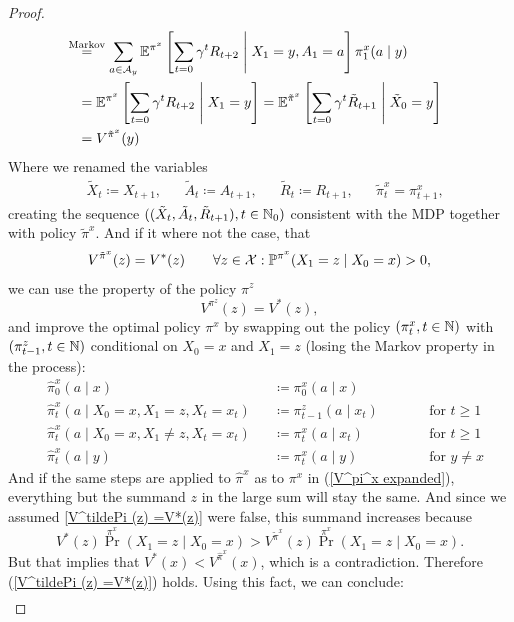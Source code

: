 \begin{proof}
\begin{align}
		&\lxeq{\text{Markov}} \sum_{a\in\cA_y}
		\E^{\pi^x}\left[\sum_{t=0}\gamma^t R_{t+2}\;\middle|\; X_1=y, A_1=a\right]\pi^x_1(a\mid y)\nonumber\\
		&=\E^{\pi^x}\left[\sum_{t=0}\gamma^t R_{t+2}\;\middle|\; X_1=y\right]
		=\E^{\tilde{\pi}^x}\left[\sum_{t=0}\gamma^t \tilde{R}_{t+1}\;\middle|\; \tilde{X}_0=y\right]\nonumber\\
		&=V^{\tilde{\pi}^x}(y)
	\end{align}
	Where we renamed the variables
	\begin{align*}
		&\tilde{X}_t\coloneqq X_{t+1}, &&\tilde{A}_t\coloneqq A_{t+1}, 
		&&\tilde{R}_t\coloneqq R_{t+1}, &&\tilde{\pi}^x_t=\pi^x_{t+1}, 
	\end{align*}
	creating the sequence 
	\(((\tilde{X}_t,\tilde{A}_t, \tilde{R}_{t+1}), t\in\mathbb{N}_0)\) consistent with the MDP together with policy \(\tilde{\pi}^x\). And if it where not the case, that 
	\begin{align}
		V^{\tilde{\pi}^x}(z)=V^*(z) \qquad \forall z\in\mathcal{X}:\mathbb{P}^{\pi^x}(X_1=z\mid X_0=x)>0,
		\label{V^tildePi (z) =V*(z)}
	\end{align}
	we can use the property of the policy \(\pi^z\)
	\[
		V^{\pi^z}(z)=V^*(z),
	\] and improve the optimal policy \(\pi^x\) by swapping out the policy \((\pi^x_t, t\in\mathbb{N}) \) with \((\pi^z_{t-1}, t\in\mathbb{N})\) conditional on \(X_0=x\) and \(X_1=z\) (losing the Markov property in the process): 
	\begin{align*}
			&\hat{\pi}^x_0(a\mid x)&&\coloneqq \pi^x_0(a\mid x) \\
			&\hat{\pi}^x_t(a\mid X_0=x,X_1=z, X_t=x_t)&&\coloneqq \pi^z_{t-1}(a\mid x_t) 
			\qquad && \text{for } t\ge 1\\
			&\hat{\pi}^x_t(a\mid X_0=x, X_1\neq z, X_t=x_t)&&\coloneqq \pi^x_t(a\mid x_t) 
			&& \text{for } t\ge 1 \\
			&\hat{\pi}^x_t(a\mid y)&&\coloneqq \pi^x_t(a\mid y) 
			&& \text{for } y\neq x
	\end{align*}
	And if the same steps are applied to \(\hat{\pi}^x\) as to \(\pi^x\) in (\ref{V^pi^x expanded}), everything but the summand \(z\) in the large sum will stay the same. And since we assumed \ref{V^tildePi (z) =V*(z)} were false, this summand increases because
	\[
		V^*(z)\Pr^{\pi^x}(X_1=z\mid X_0=x)> V^{\tilde{\pi}^x}(z) \Pr^{\pi^x}(X_1=z\mid X_0=x).
	\]
	But that implies that \(V^*(x)< V^{\hat{\pi}^x}(x)\), which is a contradiction. Therefore (\ref{V^tildePi (z) =V*(z)}) holds. Using this fact, we can conclude:
	\begin{align*}

\end{align*}
\end{proof}
